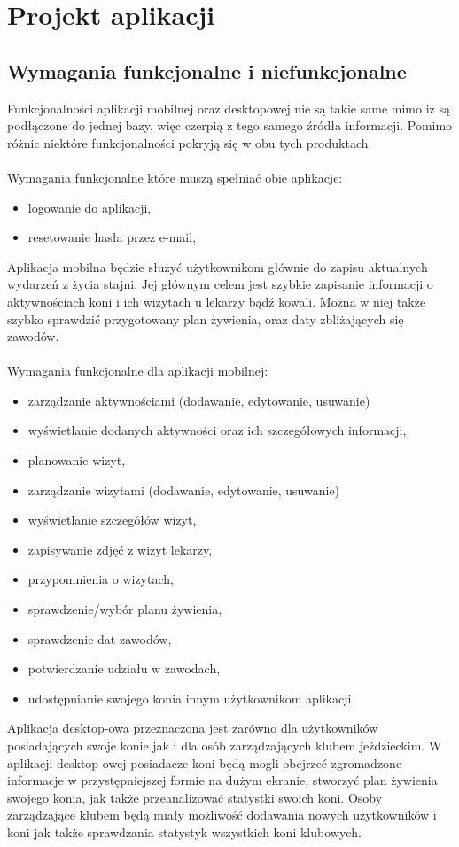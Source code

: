 \documentclass[12pt,twoside]{report}
\begin{document}
\chapter{Projekt aplikacji}
\section{Wymagania funkcjonalne i niefunkcjonalne}
Funkcjonalności aplikacji mobilnej oraz desktopowej nie są takie same mimo iż są podłączone do jednej bazy, więc czerpią z tego samego źródła informacji. Pomimo różnic niektóre funkcjonalności pokryją się w obu tych produktach.
\\ \\
Wymagania funkcjonalne które muszą spełniać obie aplikacje:
\begin{itemize}
	\item logowanie do aplikacji,
	\item resetowanie hasła przez e-mail,
\end{itemize}
Aplikacja mobilna będzie służyć użytkownikom głównie do zapisu aktualnych wydarzeń z życia stajni. Jej głównym celem jest szybkie zapisanie informacji o aktywnościach koni i ich wizytach u lekarzy bądź kowali. Można w niej także szybko sprawdzić przygotowany plan żywienia, oraz daty zbliżających się zawodów.\\ \\
Wymagania funkcjonalne dla aplikacji mobilnej:
\begin{itemize}
	\item zarządzanie aktywnościami (dodawanie, edytowanie, usuwanie)
	\item wyświetlanie dodanych aktywności oraz ich szczegółowych informacji,
	\item planowanie wizyt,
	\item zarządzanie wizytami (dodawanie, edytowanie, usuwanie)
	\item wyświetlanie szczegółów wizyt,
	\item zapisywanie zdjęć z wizyt lekarzy,
	\item przypomnienia o wizytach,
	\item sprawdzenie/wybór planu żywienia,
	\item sprawdzenie dat zawodów,
	\item potwierdzanie udziału w zawodach,
	\item udostępnianie swojego konia innym użytkownikom aplikacji
\end{itemize}
Aplikacja desktop-owa przeznaczona jest zarówno dla użytkowników posiadających swoje konie jak i dla osób zarządzających klubem jeździeckim. W aplikacji desktop-owej posiadacze koni będą mogli obejrzeć zgromadzone informacje w przystępniejszej formie na dużym ekranie, stworzyć plan żywienia swojego konia, jak także przeanalizować statystki swoich koni. Osoby zarządzające klubem będą miały możliwość dodawania nowych użytkowników i koni jak także sprawdzania statystyk wszystkich koni klubowych.
\end{document}
